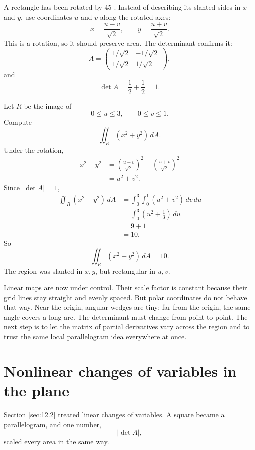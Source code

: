 \begin{example}
A rectangle has been rotated by \(45^\circ\).  Instead of describing its slanted sides in
\(x\) and \(y\), use coordinates \(u\) and \(v\) along the rotated axes:
\[
    x=\frac{u-v}{\sqrt2},
    \qquad
    y=\frac{u+v}{\sqrt2}.
\]
This is a rotation, so it should preserve area.  The determinant confirms it:
\[
    A=
    \begin{pmatrix}
        1/\sqrt2 & -1/\sqrt2\\
        1/\sqrt2 & 1/\sqrt2
    \end{pmatrix},
\]
and
\[
    \det A
    =
    \frac12+\frac12
    =
    1.
\]

Let \(R\) be the image of
\[
    0\le u\le3,
    \qquad
    0\le v\le1.
\]
Compute
\[
    \iint_R (x^2+y^2)\,dA.
\]
Under the rotation,
\[
\begin{aligned}
x^2+y^2
&=
\left(\frac{u-v}{\sqrt2}\right)^2
+
\left(\frac{u+v}{\sqrt2}\right)^2\\
&=
u^2+v^2.
\end{aligned}
\]
Since \(|\det A|=1\),
\[
\begin{aligned}
\iint_R (x^2+y^2)\,dA
&=
\int_0^3\int_0^1 (u^2+v^2)\,dv\,du\\
&=
\int_0^3\left(u^2+\frac13\right)\,du\\
&=
9+1\\
&=
10.
\end{aligned}
\]
So
\[
\boxed{
    \iint_R (x^2+y^2)\,dA=10.
}
\]
The region was slanted in \(x,y\), but rectangular in \(u,v\).
\end{example}

Linear maps are now under control.  Their scale factor is constant because their grid
lines stay straight and evenly spaced.  But polar coordinates do not behave that way.
Near the origin, angular wedges are tiny; far from the origin, the same angle covers a
long arc.  The determinant must change from point to point.  The next step is to let the
matrix of partial derivatives vary across the region and to trust the same local
parallelogram idea everywhere at once.
\section{Nonlinear changes of variables in the plane}
\label{sec:12.3}

Section \ref{sec:12.2} treated linear changes of variables.  A square became a
parallelogram, and one number,
\[
    |\det A|,
\]
scaled every area in the same way.

